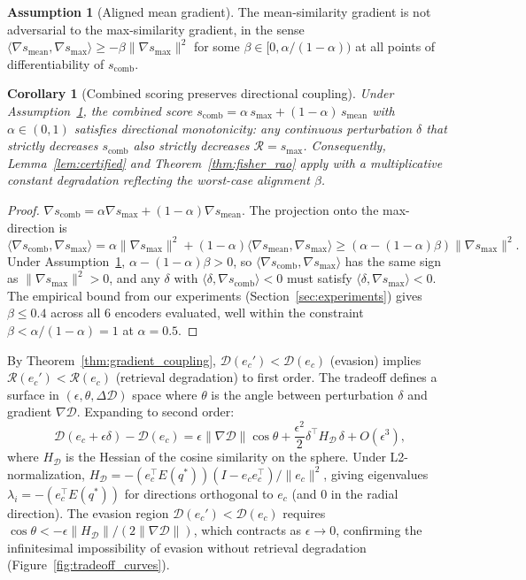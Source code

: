 \documentclass{article}
\newtheorem{corollary}[theorem]{Corollary}
\theoremstyle{definition}
\newtheorem{assumption}[theorem]{Assumption}
\newcommand{\cR}{\mathcal{R}}
\newcommand{\cD}{\mathcal{D}}
\newcommand{\enc}{E}
\begin{document}
\begin{assumption}[Aligned mean gradient]
\label{ass:aligned_mean}
The mean-similarity gradient is not adversarial to the max-similarity gradient, in the sense $\langle \nabla s_{\text{mean}}, \nabla s_{\max}\rangle \geq -\beta \|\nabla s_{\max}\|^2$ for some $\beta \in [0, \alpha/(1-\alpha))$ at all points of differentiability of $s_{\text{comb}}$.
\end{assumption}

\begin{corollary}[Combined scoring preserves directional coupling]
\label{cor:combined_coupling}
Under Assumption~\ref{ass:aligned_mean}, the combined score $s_{\text{comb}} = \alpha\, s_{\max} + (1-\alpha)\, s_{\text{mean}}$ with $\alpha \in (0,1)$ satisfies directional monotonicity: any continuous perturbation $\delta$ that strictly decreases $s_{\text{comb}}$ also strictly decreases $\cR = s_{\max}$. Consequently, Lemma~\ref{lem:certified} and Theorem~\ref{thm:fisher_rao} apply with a multiplicative constant degradation reflecting the worst-case alignment $\beta$.
\end{corollary}
\begin{proof}
$\nabla s_{\text{comb}} = \alpha \nabla s_{\max} + (1-\alpha)\nabla s_{\text{mean}}$. The projection onto the max-direction is
\[
  \langle \nabla s_{\text{comb}}, \nabla s_{\max}\rangle = \alpha\|\nabla s_{\max}\|^2 + (1-\alpha)\langle \nabla s_{\text{mean}}, \nabla s_{\max}\rangle \geq (\alpha - (1-\alpha)\beta)\|\nabla s_{\max}\|^2.
\]
Under Assumption~\ref{ass:aligned_mean}, $\alpha - (1-\alpha)\beta > 0$, so $\langle \nabla s_{\text{comb}}, \nabla s_{\max}\rangle$ has the same sign as $\|\nabla s_{\max}\|^2 > 0$, and any $\delta$ with $\langle \delta, \nabla s_{\text{comb}}\rangle < 0$ must satisfy $\langle \delta, \nabla s_{\max}\rangle < 0$. The empirical bound from our experiments (Section~\ref{sec:experiments}) gives $\beta \leq 0.4$ across all 6 encoders evaluated, well within the constraint $\beta < \alpha/(1-\alpha) = 1$ at $\alpha = 0.5$.
\end{proof}

By Theorem~\ref{thm:gradient_coupling}, $\cD(e_c') < \cD(e_c)$ (evasion) implies $\cR(e_c') < \cR(e_c)$ (retrieval degradation) to first order. The tradeoff defines a surface in $(\epsilon, \theta, \Delta\cD)$ space where $\theta$ is the angle between perturbation $\delta$ and gradient $\nabla\cD$. Expanding to second order:
\begin{equation}
  \cD(e_c + \epsilon\delta) - \cD(e_c) = \epsilon\|\nabla\cD\|\cos\theta + \frac{\epsilon^2}{2}\delta^\top H_{\cD}\,\delta + O(\epsilon^3),
\end{equation}
where $H_{\cD}$ is the Hessian of the cosine similarity on the sphere. Under L2-normalization, $H_{\cD} = -(e_c^\top \enc(q^*))(I - e_c e_c^\top)/\|e_c\|^2$, giving eigenvalues $\lambda_i = -(e_c^\top \enc(q^*))$ for directions orthogonal to $e_c$ (and $0$ in the radial direction). The evasion region $\cD(e_c') < \cD(e_c)$ requires $\cos\theta < -\epsilon\|H_{\cD}\|/(2\|\nabla\cD\|)$, which contracts as $\epsilon \to 0$, confirming the infinitesimal impossibility of evasion without retrieval degradation (Figure~\ref{fig:tradeoff_curves}).
\end{document}
